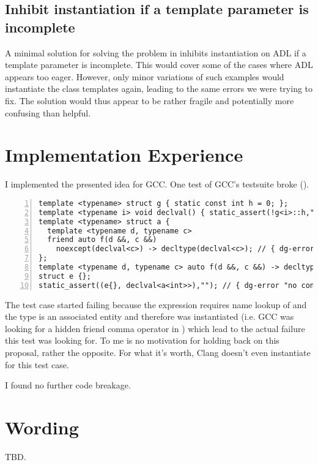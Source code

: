 \subsection{Inhibit instantiation if a template parameter is incomplete}

A minimal solution for solving the problem in  inhibits instantiation on ADL 
if a template parameter is incomplete. This would cover some of the cases where ADL 
appears too eager. However, only minor variations of such examples would instantiate the 
class templates again, leading to the same errors we were trying to fix. The solution 
would thus appear to be rather fragile and potentially more confusing than helpful.

\section{Implementation Experience}
I implemented the presented idea for GCC. One test of GCC's testsuite broke 
().
\begin{lstlisting}[style=Vc,numbers=left,float,label=lst:noexcept41,caption={
GCC test that broke after implementation of less eager ADL
}]
template <typename> struct g { static const int h = 0; };
template <typename i> void declval() { static_assert(!g<i>::h,""); }
template <typename> struct a {
  template <typename d, typename c>
  friend auto f(d &&, c &&)
    noexcept(declval<c>) -> decltype(declval<c>); // { dg-error "different exception" }
};
template <typename d, typename c> auto f(d &&, c &&) -> decltype(declval<c>);
struct e {};
static_assert((e{}, declval<a<int>>),""); // { dg-error "no context to resolve type" }
\end{lstlisting}
The test case started failing because the expression  
requires name lookup of  and the type  is an associated 
entity and therefore was instantiated (i.e. GCC was looking for a hidden friend comma 
operator in ) which lead to the actual failure this test was looking for. To 
me  is no motivation for holding back on this proposal, rather the 
opposite. For what it's worth, Clang doesn't even instantiate  for this test 
case.

I found no further code breakage.

\section{Wording}
TBD.

